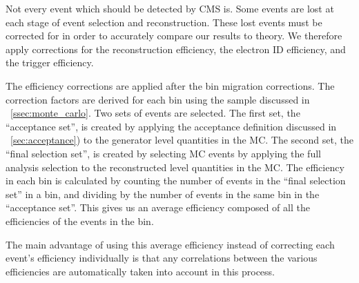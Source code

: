 Not every event which should be detected by CMS is. Some events are lost at
each stage of event selection and reconstruction. These lost events must be
corrected for in order to accurately compare our results to theory. We
therefore apply corrections for the reconstruction efficiency, the electron ID
efficiency, and the trigger efficiency.

The efficiency corrections are applied after the bin migration corrections. The
correction factors are derived for each \phistar bin using the \Ztoee \MADGRAPH
sample discussed in \SEC~\ref{ssec:monte_carlo}. Two sets of events are
selected. The first set, the ``acceptance set'', is created by applying the
acceptance definition discussed in \SEC~\ref{sec:acceptance}) to the generator
level quantities in the MC. The second set, the ``final selection set'', is
created by selecting MC events by applying the full analysis selection to the
reconstructed level quantities in the MC. The efficiency in each \phistar bin
is calculated by counting the number of events in the ``final selection set''
in a bin, and dividing by the number of events in the same bin in the
``acceptance set''. This gives us an average efficiency composed of all the
efficiencies of the events in the bin.

The main advantage of using this average efficiency instead of correcting each
event's efficiency individually is that any correlations between the various
efficiencies are automatically taken into account in this process.

